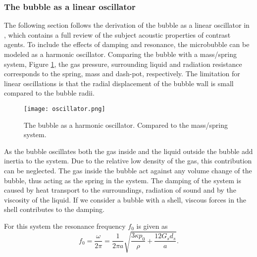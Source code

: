 
\subsubsection{The bubble as a linear oscillator}
The following section follows the derivation of the bubble as a linear oscillator in \cite{Hoff2000}, which contains a full review of the subject acoustic properties of contrast agents. To include the effects of damping and resonance, the microbubble can be modeled as a harmonic oscillator. Comparing the bubble with a mass/spring system, Figure \ref{Fig:oscillator}, the gas pressure, surrounding liquid and radiation resistance corresponds to the spring, mass and dash-pot, respectively. The limitation for linear oscillations is that the radial displacement of the bubble wall is small compared to the bubble radii. 

\begin{figure}[h]
  \centering
  \label{Fig:oscillator}
  \texttt{[image: oscillator.png]}
  \caption{The bubble as a harmonic oscillator. Compared to the mass/spring system\cite{Hoff2000}.}
\end{figure} 

As the bubble oscillates both the gas inside and the liquid outside the bubble add inertia to the system. Due to the relative low density of the gas, this contribution can be neglected. The gas inside the bubble act against any volume change of the bubble, thus acting as the spring in the system. The damping of the system is caused by heat transport to the surroundings, radiation of sound and by the viscosity of the liquid. If we consider a bubble with a shell, viscous forces in the shell contributes to the damping. 

%
%

For this system the resonance frequency $f_0$ is given as \cite{Hoff2000}
\begin{equation}
\label{resonance}
f_0 = \frac{\omega}{2 \pi}= \frac{1}{2 \pi a} \sqrt{\frac{3\kappa p_0}{\rho}+ \frac{12 G_s d_s}{a}}.
\end{equation} 

